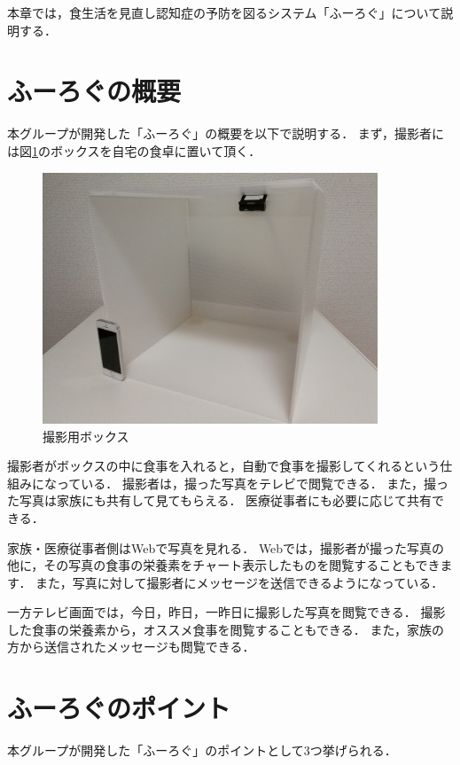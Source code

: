 \documentclass[../report]{subfiles}
\begin{document}
本章では，食生活を見直し認知症の予防を図るシステム「ふーろぐ」について説明する．

\section{ふーろぐの概要}
本グループが開発した「ふーろぐ」の概要を以下で説明する．
まず，撮影者には図\ref{fig:5_box}のボックスを自宅の食卓に置いて頂く．

\begin{figure}[htbp]
    \begin{center}
        \includegraphics[width=10cm]{imgs/5_box.jpg}
        \caption{撮影用ボックス}
        \label{fig:5_box}
    \end{center}
\end{figure}

撮影者がボックスの中に食事を入れると，自動で食事を撮影してくれるという仕組みになっている．
撮影者は，撮った写真をテレビで閲覧できる．
また，撮った写真は家族にも共有して見てもらえる．
医療従事者にも必要に応じて共有できる．

家族・医療従事者側はWebで写真を見れる．
Webでは，撮影者が撮った写真の他に，その写真の食事の栄養素をチャート表示したものを閲覧することもできます．
また，写真に対して撮影者にメッセージを送信できるようになっている．

一方テレビ画面では，今日，昨日，一昨日に撮影した写真を閲覧できる．
撮影した食事の栄養素から，オススメ食事を閲覧することもできる．
また，家族の方から送信されたメッセージも閲覧できる．


\section{ふーろぐのポイント}
本グループが開発した「ふーろぐ」のポイントとして3つ挙げられる．
\end{document}
